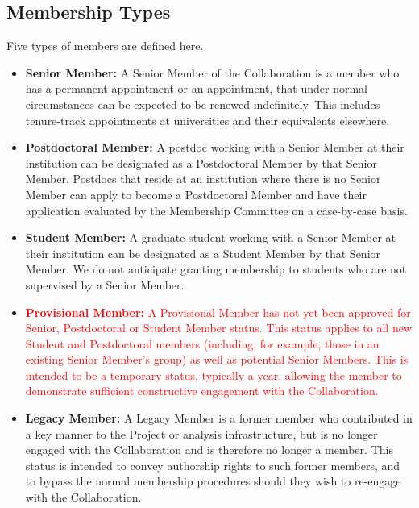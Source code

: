\documentclass[12pt]{article}
\begin{document}
\vspace{0.2in}
\noindent



\subsection{Membership Types}
\label{sec:memtypes}
Five types of members are defined here.  
\begin{itemize}

\item {\bf Senior Member:} A Senior Member of the Collaboration is a member who has a permanent appointment or an appointment, that under normal circumstances can be expected to be renewed indefinitely.   This includes tenure-track appointments at universities and their equivalents elsewhere.  

\item {\bf Postdoctoral Member:} A postdoc working with a Senior Member at their institution can be designated as a Postdoctoral Member by that Senior Member.  Postdocs that reside at an institution where there is no Senior Member can apply to become a Postdoctoral Member and have their application evaluated by the Membership Committee on a case-by-case basis. 

\item {\bf Student Member:} A graduate student working with a Senior Member at their institution can be designated as a Student Member by that Senior Member.  We do not anticipate granting membership to students who are not supervised by a Senior Member.


\item\textcolor{red}{ {\bf Provisional Member:}  A Provisional Member has not yet been approved for
Senior, Postdoctoral or Student Member status.  This status applies to all new Student and Postdoctoral members
(including, for example, those in an existing Senior Member's group) as well as potential Senior Members.  This is intended to be a temporary status, typically a year, allowing the member to demonstrate
sufficient constructive engagement with the Collaboration.
}


\item {\bf Legacy Member:}  A Legacy Member is a former member who contributed in a key manner to the Project or analysis infrastructure, but is no longer engaged with the Collaboration and is therefore no longer a member.  This status is intended to convey authorship rights to such former members, and to bypass the normal membership procedures should they wish to re-engage with the Collaboration.


\end{itemize}
\end{document}
